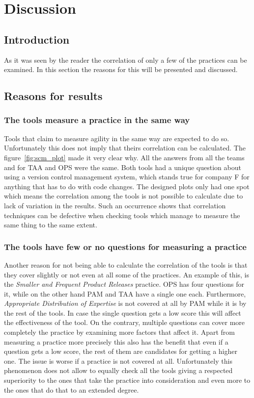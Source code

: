 \section{Discussion}

\subsection{Introduction}
As it was seen by the reader the correlation of only a few of the practices can be examined. In this section the reasons for this will be presented and discussed.

\subsection{Reasons for results}


\subsubsection{The tools measure a practice in the same way}
Tools that claim to measure agility in the same way are expected to do so. Unfortunately this does not imply that theirs correlation can be calculated. The figure~\ref{fig:scm_plot} made it very clear why. All the answers from all the teams and for TAA and OPS were the same. Both tools had a unique question about using a version control management system, which stands true for company F for anything that has to do with code changes. The designed plots only had one spot which means the correlation among the tools is not possible to calculate due to lack of variation in the results. Such an occurrence shows that correlation techniques can be defective when checking tools which manage to measure the same thing to the same extent.

\subsubsection{The tools have few or no questions for measuring a practice}
Another reason for not being able to calculate the correlation of the tools is that they cover slightly or not even at all some of the practices. An example of this, is the \textit{Smaller and Frequent Product Releases} practice. OPS has four questions for it, while on the other hand PAM and TAA have a single one each. Furthermore, \textit{Appropriate Distribution of Expertise} is not covered at all by PAM while it is by the rest of the tools. In case the single question gets a low score this will affect the effectiveness of the tool. On the contrary, multiple questions can cover more completely the practice by examining more factors that affect it. Apart from measuring a practice more precisely this also has the benefit that even if a question gets a low score, the rest of them are candidates for getting a higher one. The issue is worse if a practice is not covered at all. Unfortunately this phenomenon does not allow to equally check all the tools giving a respected superiority to the ones that take the practice into consideration and even more to the ones that do that to an extended degree.

